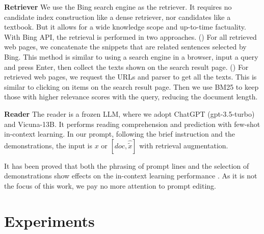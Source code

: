 \noindent \textbf{Retriever} \quad 
We use the Bing search engine as the retriever. 
It requires no candidate index construction like a dense retriever, nor candidates like a textbook. 
But it allows for a wide knowledge scope and up-to-time factuality.
With Bing API, the retrieval is performed in two approaches.
() For all retrieved web pages, we concatenate the snippets that are related sentences selected by Bing. 
This method is similar to using a search engine in a browser, input a query and press Enter, then collect the texts shown on the search result page.
() For retrieved web pages, we request the URLs and parser to get all the texts. This is similar to clicking on items on the search result page. 
Then we use BM25 to keep those with higher relevance scores with the query, reducing the document length.

\noindent \textbf{Reader} \quad 
The reader is a frozen LLM, where we adopt ChatGPT (gpt-3.5-turbo) and Vicuna-13B.
It performs reading comprehension and prediction with few-shot in-context learning.
In our prompt, following the brief instruction and the demonstrations, the input is $x$ or $[doc, \hat{\tilde{x}}]$ with retrieval augmentation.

It has been proved that both the phrasing of prompt lines \cite{zhang2023tempera} and the selection of demonstrations show effects on the in-context learning performance \cite{su2022selective, zhang2023autocot}.
As it is not the focus of this work, we pay no more attention to prompt editing.

\section{Experiments}
